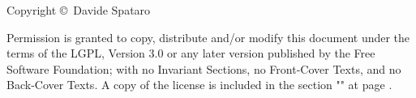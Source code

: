 \null\vfill
\noindent
Copyright \copyright \the\year\ Davide Spataro\par
Permission is granted to copy, distribute and/or modify this document under the terms of the LGPL, Version 3.0 or any later version published by the Free Software Foundation; with no Invariant Sections, no Front-Cover Texts, and no Back-Cover Texts. A copy of the license is included in the section "" at page \pageref{license:gnu}. 




